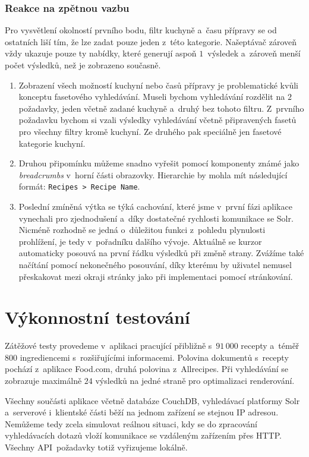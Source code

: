 \subsubsection{Reakce na zpětnou vazbu}

Pro vysvětlení okolností prvního bodu, filtr kuchyně a~času přípravy se od ostatních liší tím, že lze zadat pouze jeden z~této kategorie. Našeptávač zároveň vždy ukazuje pouze ty nabídky, které generují aspoň $1$~výsledek a~zároveň menší počet výsledků, než je zobrazeno současně. 

\begin{enumerate}
    \item Zobrazení všech možností kuchyní nebo časů přípravy je problematické kvůli konceptu fasetového vyhledávání. Museli bychom vyhledávání rozdělit na $2$ požadavky, jeden včetně zadané kuchyně a~druhý bez tohoto filtru. Z~prvního požadavku bychom si vzali výsledky vyhledávání včetně připravených fasetů pro všechny filtry kromě kuchyní. Ze druhého pak speciálně jen fasetové kategorie kuchyní.
    \item Druhou připomínku můžeme snadno vyřešit pomocí komponenty známé jako \emph{breadcrumbs} v~horní části obrazovky. Hierarchie by mohla mít následující formát: \texttt{Recipes\,>\,Recipe\,Name}.
    \item Poslední zmíněná výtka se týká cachování, které jsme v~první fázi aplikace vynechali pro zjednodušení a~díky dostatečné rychlosti komunikace se Solr. Nicméně rozhodně se jedná o~důležitou funkci z~pohledu plynulosti prohlížení, je tedy v~pořadníku dalšího vývoje. Aktuálně se kurzor automaticky posouvá na první řádku výsledků při změně strany. Zvážíme také načítání pomocí nekonečného posouvání, díky kterému by uživatel nemusel přeskakovat mezi okraji stránky jako při implementaci pomocí stránkování.
\end{enumerate}

\section{Výkonnostní testování}

Zátěžové testy provedeme v~aplikaci pracující přibližně s~$91\,000$ recepty a~té\-měř $800$ ingrediencemi s~rozšiřujícími informacemi. Polovina dokumentů s~recepty pochází z~aplikace Food.com, druhá polovina z~Allrecipes. Při vyhledávání se zobrazuje maximálně $24$ výsledků na jedné straně pro optimalizaci renderování.

Všechny součásti aplikace včetně databáze CouchDB, vyhledávací platformy Solr a~serverové i~klientské části běží na jednom zařízení se stejnou IP adresou. Nemůžeme tedy zcela simulovat reálnou situaci, kdy se do zpracování vyhledávacích dotazů vloží komunikace se vzdáleným zařízením přes HTTP. Všechny API~požadavky totiž vyřizujeme lokálně.

